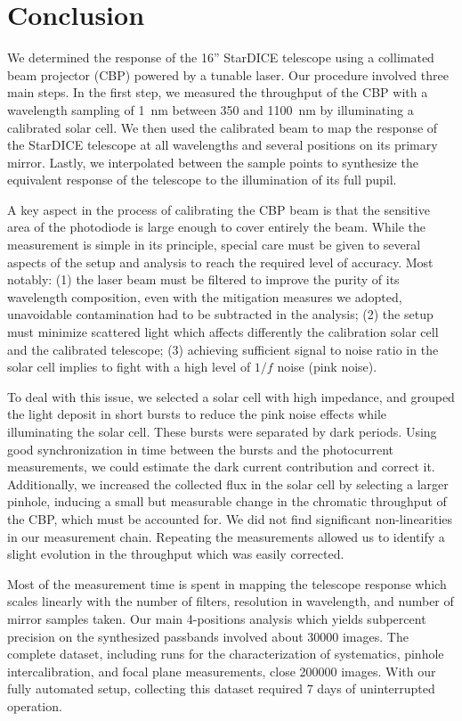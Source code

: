 \section{Conclusion}
\label{sec:discussion}

We determined the response of the 16'' StarDICE telescope using a
collimated beam projector (CBP) powered by a tunable laser. Our
procedure involved three main steps. In the first step, we measured the
throughput of the CBP with a wavelength sampling of \SI{1}{nm} between
350 and \SI{1100}{nm} by illuminating a calibrated solar cell. We then
used the calibrated beam to map the response of the StarDICE telescope
at all wavelengths and several positions on its primary
mirror. Lastly, we interpolated between the sample points to
synthesize the equivalent response of the telescope to the illumination
of its full pupil.

A key aspect in the process of calibrating the CBP beam is that the
sensitive area of the photodiode is large enough to cover entirely the
beam. While the measurement is simple in its principle, special
care must be given to several aspects of the setup and analysis to
reach the required level of accuracy. Most notably: (1) the laser beam must be filtered to improve the purity of its wavelength
composition, even with the mitigation measures we adopted, unavoidable
contamination had to be subtracted in the analysis; (2) the setup must minimize scattered light which affects differently the calibration solar cell and the calibrated telescope; (3) achieving sufficient signal to noise ratio in the solar cell implies to fight with a high level of $1/f$ noise (pink noise).

To deal with this issue, we selected a solar cell with high
impedance, and grouped the light deposit in short bursts to reduce the
pink noise effects while illuminating the solar cell.
These bursts were separated by dark periods. Using good synchronization in time
between the bursts and the photocurrent measurements, 
we could estimate the dark current contribution and correct it.
Additionally, we increased the collected flux in the solar cell 
by selecting a larger pinhole, inducing a small but measurable change in the
chromatic throughput of the CBP, which must be accounted for.
We did not find significant non-linearities in our measurement
chain. Repeating the measurements allowed us to identify a slight
evolution in the throughput which was easily corrected.

Most of the measurement time is spent in mapping the telescope
response which scales linearly with the number of filters,
resolution in wavelength, and number of mirror samples taken. Our main
4-positions analysis which yields subpercent precision on the
synthesized passbands involved about \num{30000} images. The complete
dataset, including runs for the characterization of systematics,
pinhole intercalibration, and focal plane measurements, close \num{200000}
images. With our fully automated setup, collecting this dataset required
7 days of uninterrupted operation. 

